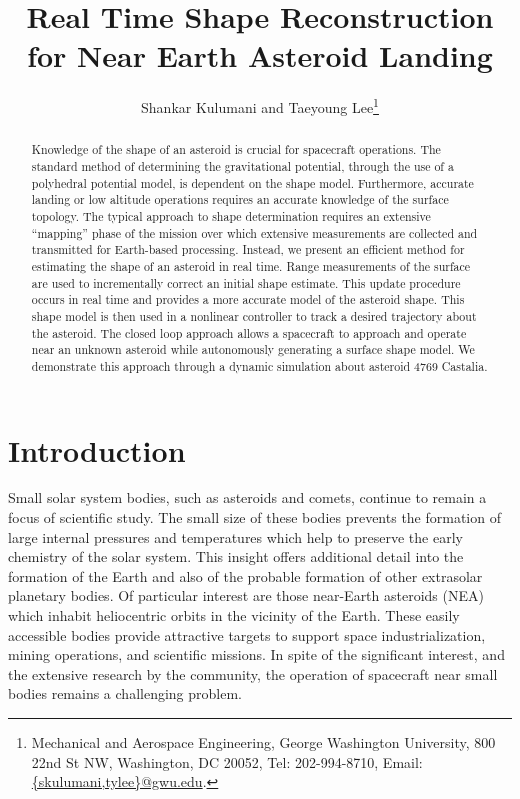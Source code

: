 \documentclass[letterpaper, paper,11pt]{AAS}		%
\begin{document}
\title{Real Time Shape Reconstruction for Near Earth Asteroid Landing}

\author{Shankar Kulumani and Taeyoung Lee\thanks{Mechanical and Aerospace Engineering, George Washington University, 800 22nd St NW, Washington, DC 20052, Tel: 202-994-8710, Email: \href{mailto:skulumani@gwu.edu}{\{skulumani,tylee\}@gwu.edu}.}
}


\maketitle{} 		

\begin{abstract}
    Knowledge of the shape of an asteroid is crucial for spacecraft operations.
    The standard method of determining the gravitational potential, through the use of a polyhedral potential model, is dependent on the shape model.
    Furthermore, accurate landing or low altitude operations requires an accurate knowledge of the surface topology. 
    The typical approach to shape determination requires an extensive ``mapping'' phase of the mission over which extensive measurements are collected and transmitted for Earth-based processing.
    Instead, we present an efficient method for estimating the shape of an asteroid in real time.
    Range measurements of the surface are used to incrementally correct an initial shape estimate.
    This update procedure occurs in real time and provides a more accurate model of the asteroid shape.
    This shape model is then used in a nonlinear controller to track a desired trajectory about the asteroid.
    The closed loop approach allows a spacecraft to approach and operate near an unknown asteroid while autonomously generating a surface shape model.
    We demonstrate this approach through a dynamic simulation about asteroid 4769 Castalia.
\end{abstract}

\section{Introduction}\label{sec:introduction}
Small solar system bodies, such as asteroids and comets, continue to remain a focus of scientific study.
The small size of these bodies prevents the formation of large internal pressures and temperatures which help to preserve the early chemistry of the solar system.
This insight offers additional detail into the formation of the Earth and also of the probable formation of other extrasolar planetary bodies.
Of particular interest are those near-Earth asteroids (NEA) which inhabit heliocentric orbits in the vicinity of the Earth. 
These easily accessible bodies provide attractive targets to support space industrialization, mining operations, and scientific missions.
In spite of the significant interest, and the extensive research by the community, the operation of spacecraft near small bodies remains a challenging problem.
\end{document}
